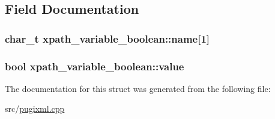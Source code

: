 \subsection{Field Documentation}
\hypertarget{structxpath__variable__boolean_a2b2cb81ee5c9a19a667428d08d5bb951}{
\subsubsection[{name}]{\setlength{\rightskip}{0pt plus 5cm}char\_\-t {\bf xpath\_\-variable\_\-boolean::name}\mbox{[}1\mbox{]}}}
\label{structxpath__variable__boolean_a2b2cb81ee5c9a19a667428d08d5bb951}
\hypertarget{structxpath__variable__boolean_ab54117a6cced8c3e029724651df4d404}{
\subsubsection[{value}]{\setlength{\rightskip}{0pt plus 5cm}bool {\bf xpath\_\-variable\_\-boolean::value}}}
\label{structxpath__variable__boolean_ab54117a6cced8c3e029724651df4d404}


The documentation for this struct was generated from the following file:\begin{DoxyCompactItemize}
\item 
src/\hyperlink{pugixml_8cpp}{pugixml.cpp}\end{DoxyCompactItemize}
